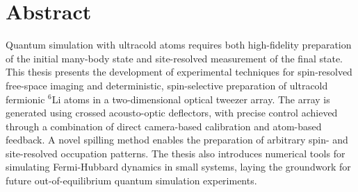
\thispagestyle{plain}

\section*{Abstract}

\noindent
Quantum simulation with ultracold atoms requires both high-fidelity preparation of the initial many-body state and site-resolved measurement of the final state. This thesis presents the development of experimental techniques for spin-resolved free-space imaging and deterministic, spin-selective preparation of ultracold fermionic $^6$Li atoms in a two-dimensional optical tweezer array. The array is generated using crossed acousto-optic deflectors, with precise control achieved through a combination of direct camera-based calibration and atom-based feedback. A novel spilling method enables the preparation of arbitrary spin- and site-resolved occupation patterns. The thesis also introduces numerical tools for simulating Fermi-Hubbard dynamics in small systems, laying the groundwork for future out-of-equilibrium quantum simulation experiments.

